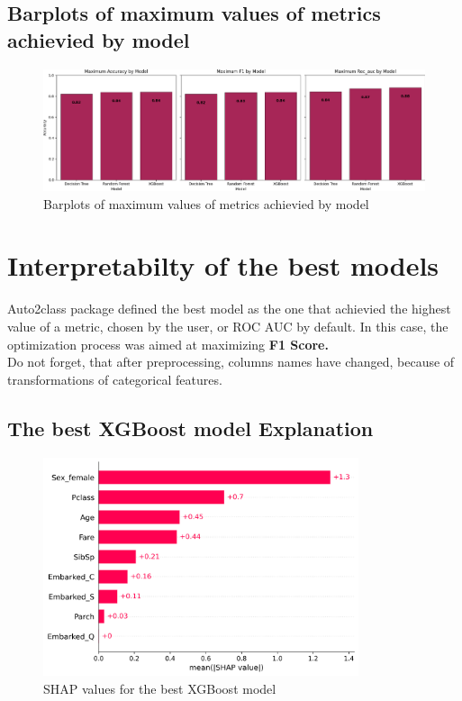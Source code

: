 \documentclass{article}%
\begin{document}
%
\subsection{Barplots of maximum values of metrics achievied by model}%
\label{subsec:Barplotsofmaximumvaluesofmetricsachieviedbymodel}%


\begin{figure}[h!]%
\centering%
\includegraphics[width=460px]{ModelOptimization/barplots_max_metric.png}%
\caption{Barplots of maximum values of metrics achievied by model}%
\end{figure}

%
\newpage%
\section{Interpretabilty of the best models}%
\label{sec:Interpretabiltyofthebestmodels}%
Auto2class package defined the best model as the one that achievied the highest value of a metric, chosen by the user, or ROC AUC by default.%
In this case, the optimization process was aimed at maximizing%
\textbf{ F1 Score.}%
\\%
Do not forget, that after preprocessing, columns names have changed, because of transformations of categorical features.%
\subsection{The best XGBoost model Explanation}%
\label{subsec:ThebestXGBoostmodelExplanation}%


\begin{figure}[h!]%
\centering%
\includegraphics[width=350px]{XAI/XGBoost/global_feature_importance_shap.png}%
\caption{SHAP values for the best XGBoost model}%
\end{figure}
\end{document}
